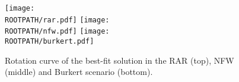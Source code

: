 \begin{figure}%
	\centering%
	\texttt{[image: \\ROOTPATH/rar.pdf]}
	\texttt{[image: \\ROOTPATH/nfw.pdf]}
	\texttt{[image: \\ROOTPATH/burkert.pdf]}
	\caption{Rotation curve of the best-fit solution in the RAR (top), NFW (middle) and Burkert scenario (bottom).}%
	\label{fig:vrot}%
\end{figure}